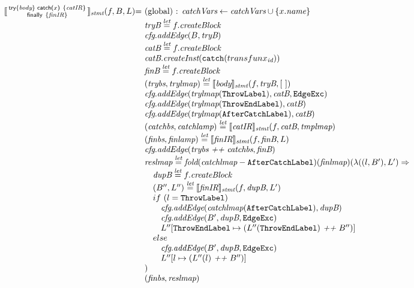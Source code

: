 \[
\begin{array}{l@{}l@{~}l}
\transfun{\irtryfull{\emph{body}}{x}{\emph{catIR}}{\emph{finIR}}}_{\emph{stmt}}(f, B, L)
& = & \text{(global) : } \emph{catchVars} \leftarrow \emph{catchVars} \cup \{ x.\emph{name} \}\\
& & \emph{tryB} \letval f.\emph{createBlock}\\
& & \emph{cfg}.\emph{addEdge}(B, \emph{tryB})\\
& & \emph{catB} \letval f.\emph{createBlock}\\
& & \emph{catB}.\emph{createInst}(\TT{catch}(transfun{x}_{\emph{id}}))\\
& & \emph{finB} \letval f.\emph{createBlock}\\
& & (\emph{trybs}, \emph{trylmap}) \letval \transfun{\emph{body}}_{\emph{stmt}}(f, \emph{tryB}, [\ ])\\
& & \emph{cfg}.\emph{addEdge}(\emph{trylmap}(\ThrowLabel), \emph{catB}, \EdgeExc)\\
& & \emph{cfg}.\emph{addEdge}(\emph{trylmap}(\ThrowEndLabel), \emph{catB})\\
& & \emph{cfg}.\emph{addEdge}(\emph{trylmap}(\AfterCatchLabel), \emph{catB})\\
& & (\emph{catchbs}, \emph{catchlamp}) \letval \transfun{\emph{catIR}}_{\emph{stmt}}(f, \emph{catB}, \emph{tmplmap})\\
& & (\emph{finbs}, \emph{finlamp}) \letval \transfun{\emph{finIR}}_{\emph{stmt}}(f, \emph{finB}, L)\\
& & \emph{cfg}.\emph{addEdge}(\emph{trybs} ~\emph{++}~ \emph{catchbs}, \emph{finB})\\
& & \emph{reslmap} \letval \fold(\emph{catchlmap} - \AfterCatchLabel)(\emph{finlmap})
(\lambda((l, B'), L') \Rightarrow \\
& & \quad \emph{dupB} \letval f.\emph{createBlock}\\
& & \quad (B'', L'') \letval \transfun{\emph{finIR}}_{\emph{stmt}}(f, \emph{dupB}, L')\\
& & \quad if\ (l = \ThrowLabel)\\
& & \quad \phantom{if} \emph{cfg}.\emph{addEdge}(\emph{catchlmap}(\AfterCatchLabel), \emph{dupB})\\
& & \quad \phantom{if} \emph{cfg}.\emph{addEdge}(B', \emph{dupB}, \EdgeExc)\\
& & \quad \phantom{if} L''[\ThrowEndLabel \mapsto (L''(\ThrowEndLabel) ~\emph{++}~ B'')]\\
& & \quad else\\
& & \quad \phantom{if} \emph{cfg}.\emph{addEdge}(B', \emph{dupB}, \EdgeExc)\\
& & \quad \phantom{if} L''[l \mapsto (L''(l) ~\emph{++}~ B'')]\\
& & )\\
& & (\emph{finbs}, \emph{reslmap})\\
& & \\


\end{array}\]
